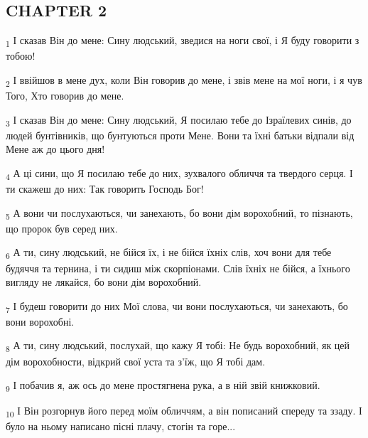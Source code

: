 \subsection{CHAPTER 2}
\begin{tcolorbox}
\textsubscript{1} І сказав Він до мене: Сину людський, зведися на ноги свої, і Я буду говорити з тобою!
\end{tcolorbox}
\begin{tcolorbox}
\textsubscript{2} І ввійшов в мене дух, коли Він говорив до мене, і звів мене на мої ноги, і я чув Того, Хто говорив до мене.
\end{tcolorbox}
\begin{tcolorbox}
\textsubscript{3} І сказав Він до мене: Сину людський, Я посилаю тебе до Ізраїлевих синів, до людей бунтівників, що бунтуються проти Мене. Вони та їхні батьки відпали від Мене аж до цього дня!
\end{tcolorbox}
\begin{tcolorbox}
\textsubscript{4} А ці сини, що Я посилаю тебе до них, зухвалого обличчя та твердого серця. І ти скажеш до них: Так говорить Господь Бог!
\end{tcolorbox}
\begin{tcolorbox}
\textsubscript{5} А вони чи послухаються, чи занехають, бо вони дім ворохобний, то пізнають, що пророк був серед них.
\end{tcolorbox}
\begin{tcolorbox}
\textsubscript{6} А ти, сину людський, не бійся їх, і не бійся їхніх слів, хоч вони для тебе будяччя та тернина, і ти сидиш між скорпіонами. Слів їхніх не бійся, а їхнього вигляду не лякайся, бо вони дім ворохобний.
\end{tcolorbox}
\begin{tcolorbox}
\textsubscript{7} І будеш говорити до них Мої слова, чи вони послухаються, чи занехають, бо вони ворохобні.
\end{tcolorbox}
\begin{tcolorbox}
\textsubscript{8} А ти, сину людський, послухай, що кажу Я тобі: Не будь ворохобний, як цей дім ворохобности, відкрий свої уста та з'їж, що Я тобі дам.
\end{tcolorbox}
\begin{tcolorbox}
\textsubscript{9} І побачив я, аж ось до мене простягнена рука, а в ній звій книжковий.
\end{tcolorbox}
\begin{tcolorbox}
\textsubscript{10} І Він розгорнув його перед моїм обличчям, а він пописаний спереду та ззаду. І було на ньому написано пісні плачу, стогін та горе...
\end{tcolorbox}
